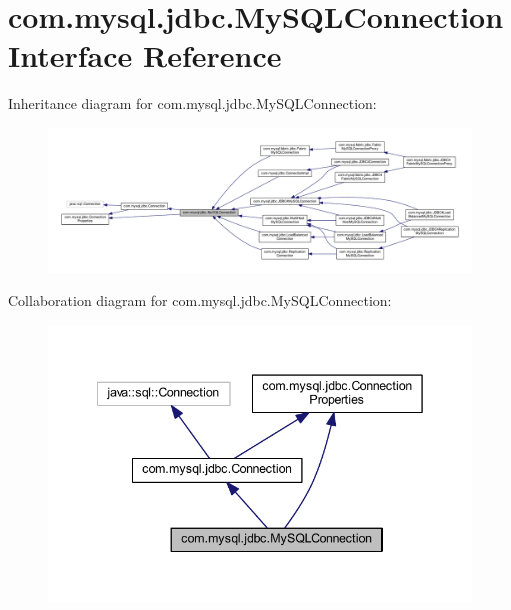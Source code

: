 \hypertarget{interfacecom_1_1mysql_1_1jdbc_1_1_my_s_q_l_connection}{}\section{com.\+mysql.\+jdbc.\+My\+S\+Q\+L\+Connection Interface Reference}
\label{interfacecom_1_1mysql_1_1jdbc_1_1_my_s_q_l_connection}


Inheritance diagram for com.\+mysql.\+jdbc.\+My\+S\+Q\+L\+Connection\+:
\nopagebreak
\begin{figure}[H]
\begin{center}
\leavevmode
\includegraphics[width=350pt]{interfacecom_1_1mysql_1_1jdbc_1_1_my_s_q_l_connection__inherit__graph}
\end{center}
\end{figure}


Collaboration diagram for com.\+mysql.\+jdbc.\+My\+S\+Q\+L\+Connection\+:
\nopagebreak
\begin{figure}[H]
\begin{center}
\leavevmode
\includegraphics[width=342pt]{interfacecom_1_1mysql_1_1jdbc_1_1_my_s_q_l_connection__coll__graph}
\end{center}
\end{figure}
